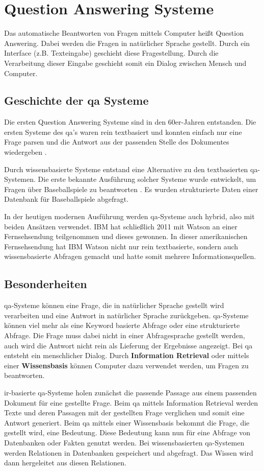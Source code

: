 \documentclass[
        ngerman,
        paper=a4,
        numbers=noendperiod,
]{scrreprt}
\begin{document}
\chapter{Question Answering Systeme}
Das automatische Beantworten von Fragen mittels Computer heißt Question Answering. Dabei werden die Fragen in natürlicher Sprache gestellt. Durch ein Interface (z.B. Texteingabe) geschieht diese Fragestellung. Durch die Verarbeitung dieser Eingabe geschieht somit ein Dialog zwischen Mensch und Computer.
\section{Geschichte der \ac{qa} Systeme}
Die ersten Question Answering Systeme sind in den 60er-Jahren entstanden. Die ersten Systeme des \ac{qa}'s waren rein textbasiert und konnten einfach nur eine Frage parsen und die Antwort aus der passenden Stelle des Dokumentes wiedergeben \citep{phillips1960question}.

Durch wissensbasierte Systeme entstand eine Alternative zu den textbasierten \ac{qa}-Systemen. Die erste bekannte Ausführung solcher Systeme wurde entwickelt, um Fragen über Baseballspiele zu beantworten \citep{green1986baseball}. Es wurden strukturierte Daten einer Datenbank für Baseballspiele abgefragt. 

In der heutigen modernen Ausführung werden \ac{qa}-Systeme auch hybrid, also mit beiden Ansätzen verwendet. IBM hat schließlich 2011 mit Watson an einer Fernsehsendung teilgenommen und dieses gewonnen. In dieser amerikanischen Fernsehsendung hat IBM Watson nicht nur rein textbasierte, sondern auch wissensbasierte Abfragen gemacht und hatte somit mehrere Informationsquellen.

\section{Besonderheiten}
\ac{qa}-Systeme können eine Frage, die in natürlicher Sprache gestellt wird verarbeiten und eine Antwort in natürlicher Sprache zurückgeben. \ac{qa}-Systeme können viel mehr als eine Keyword basierte Abfrage oder eine strukturierte Abfrage. Die Frage muss dabei nicht in einer Abfragesprache gestellt werden, auch wird die Antwort nicht rein als Lieferung der Ergebnisse angezeigt. Bei \ac{qa} entsteht ein menschlicher Dialog. Durch \textbf{Information Retrieval} oder mittels einer \textbf{Wissensbasis} können Computer dazu verwendet werden, um Fragen zu beantworten.  

\ac{ir}-basierte \ac{qa}-Systeme holen zunächst die passende Passage aus einem passenden Dokument für eine gestellte Frage. Beim \ac{qa} mittels Information Retrieval werden Texte und deren Passagen mit der gestellten Frage verglichen und somit eine Antwort generiert.
Beim \ac{qa} mittels einer Wissensbasis bekommt die Frage, die gestellt wird, eine Bedeutung. Diese Bedeutung kann nun für eine Abfrage von Datenbanken oder Fakten genutzt werden. Bei wissensbasierten \ac{qa}-Systemen werden Relationen in Datenbanken gespeichert und abgefragt. Das Wissen wird dann hergeleitet aus diesen Relationen. 
\end{document}
